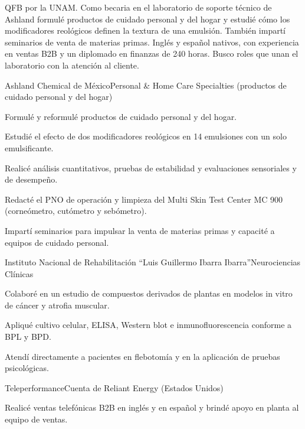 \documentclass[letterpaper]{article}
\begin{document}
\makecvheader

QFB por la UNAM. Como becaria en el laboratorio de soporte técnico de Ashland formulé productos de cuidado personal y del hogar y estudié cómo los modificadores reológicos definen la textura de una emulsión. También impartí seminarios de venta de materias primas. Inglés y español nativos, con experiencia en ventas B2B y un diplomado en finanzas de 240 horas. Busco roles que unan el laboratorio con la atención al cliente.

        {Ashland Chemical de México}{Personal \& Home Care Specialties (productos de cuidado personal y del hogar)}
\begin{cvitems}
  \item Formulé y reformulé productos de cuidado personal y del hogar.
  \item Estudié el efecto de dos modificadores reológicos en 14 emulsiones con un solo emulsificante.
  \item Realicé análisis cuantitativos, pruebas de estabilidad y evaluaciones sensoriales y de desempeño.
  \item Redacté el PNO de operación y limpieza del Multi Skin Test Center MC 900 (corneómetro, cutómetro y sebómetro).
  \item Impartí seminarios para impulsar la venta de materias primas y capacité a equipos de cuidado personal.
\end{cvitems}

        {Instituto Nacional de Rehabilitación “Luis Guillermo Ibarra Ibarra”}{Neurociencias Clínicas}
\begin{cvitems}
  \item Colaboré en un estudio de compuestos derivados de plantas en modelos in vitro de cáncer y atrofia muscular.
  \item Apliqué cultivo celular, ELISA, Western blot e inmunofluorescencia conforme a BPL y BPD.
  \item Atendí directamente a pacientes en flebotomía y en la aplicación de pruebas psicológicas.
\end{cvitems}

        {Teleperformance}{Cuenta de Reliant Energy (Estados Unidos)}
\begin{cvitems}
  \item Realicé ventas telefónicas B2B en inglés y en español y brindé apoyo en planta al equipo de ventas.
\end{cvitems}
\end{document}
